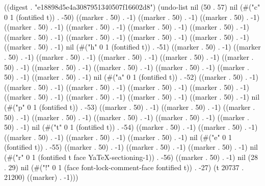 
((digest . "e18898d5e4a3087951340507f16602d8") (undo-list nil (50 . 57) nil (#("c" 0 1 (fontified t)) . -50) ((marker . 50) . -1) ((marker . 50) . -1) ((marker . 50) . -1) ((marker . 50) . -1) ((marker . 50) . -1) ((marker . 50) . -1) ((marker . 50) . -1) ((marker . 50) . -1) ((marker . 50) . -1) ((marker . 50) . -1) ((marker . 50) . -1) ((marker . 50) . -1) nil (#("h" 0 1 (fontified t)) . -51) ((marker . 50) . -1) ((marker . 50) . -1) ((marker . 50) . -1) ((marker . 50) . -1) ((marker . 50) . -1) ((marker . 50) . -1) ((marker . 50) . -1) ((marker . 50) . -1) ((marker . 50) . -1) ((marker . 50) . -1) ((marker . 50) . -1) nil (#("a" 0 1 (fontified t)) . -52) ((marker . 50) . -1) ((marker . 50) . -1) ((marker . 50) . -1) ((marker . 50) . -1) ((marker . 50) . -1) ((marker . 50) . -1) ((marker . 50) . -1) ((marker . 50) . -1) ((marker . 50) . -1) nil (#("p" 0 1 (fontified t)) . -53) ((marker . 50) . -1) ((marker . 50) . -1) ((marker . 50) . -1) ((marker . 50) . -1) ((marker . 50) . -1) ((marker . 50) . -1) ((marker . 50) . -1) nil (#("t" 0 1 (fontified t)) . -54) ((marker . 50) . -1) ((marker . 50) . -1) ((marker . 50) . -1) ((marker . 50) . -1) ((marker . 50) . -1) nil (#("e" 0 1 (fontified t)) . -55) ((marker . 50) . -1) ((marker . 50) . -1) ((marker . 50) . -1) nil (#("r" 0 1 (fontified t face YaTeX-sectioning-1)) . -56) ((marker . 50) . -1) nil (28 . 29) nil (#("!" 0 1 (face font-lock-comment-face fontified t)) . -27) (t 20737 . 21200) ((marker) . -1)))
